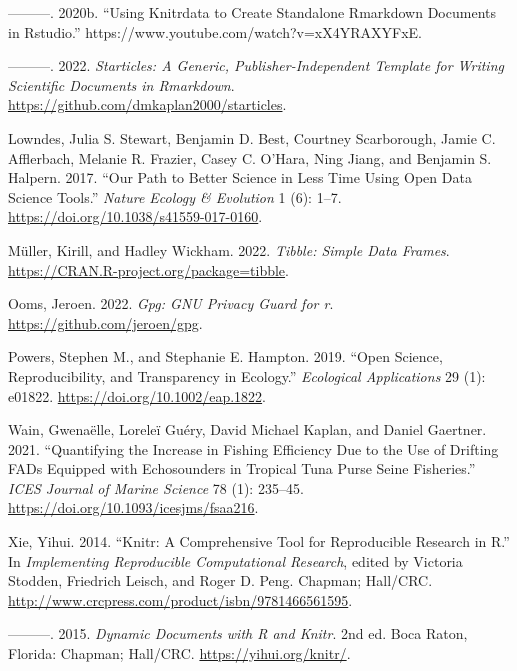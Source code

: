 \begin{CSLReferences}{1}{0}
\leavevmode{}%
---------. 2020b. {``Using Knitrdata to Create Standalone {Rmarkdown} Documents in {Rstudio}.''} https://www.youtube.com/watch?v=xX4YRAXYFxE.

\leavevmode{}%
---------. 2022. \emph{Starticles: A Generic, Publisher-Independent Template for Writing Scientific Documents in Rmarkdown}. \url{https://github.com/dmkaplan2000/starticles}.

\leavevmode{}%
Lowndes, Julia S. Stewart, Benjamin D. Best, Courtney Scarborough, Jamie C. Afflerbach, Melanie R. Frazier, Casey C. O'Hara, Ning Jiang, and Benjamin S. Halpern. 2017. {``Our Path to Better Science in Less Time Using Open Data Science Tools.''} \emph{Nature Ecology \& Evolution} 1 (6): 1--7. \url{https://doi.org/10.1038/s41559-017-0160}.

\leavevmode{}%
Müller, Kirill, and Hadley Wickham. 2022. \emph{Tibble: Simple Data Frames}. \url{https://CRAN.R-project.org/package=tibble}.

\leavevmode{}%
Ooms, Jeroen. 2022. \emph{Gpg: GNU Privacy Guard for r}. \url{https://github.com/jeroen/gpg}.

\leavevmode{}%
Powers, Stephen M., and Stephanie E. Hampton. 2019. {``Open Science, Reproducibility, and Transparency in Ecology.''} \emph{Ecological Applications} 29 (1): e01822. \url{https://doi.org/10.1002/eap.1822}.

\leavevmode{}%
Wain, Gwenaëlle, Loreleï Guéry, David Michael Kaplan, and Daniel Gaertner. 2021. {``Quantifying the Increase in Fishing Efficiency Due to the Use of Drifting {FADs} Equipped with Echosounders in Tropical Tuna Purse Seine Fisheries.''} \emph{ICES Journal of Marine Science} 78 (1): 235--45. \url{https://doi.org/10.1093/icesjms/fsaa216}.

\leavevmode{}%
Xie, Yihui. 2014. {``Knitr: A Comprehensive Tool for Reproducible Research in {R}.''} In \emph{Implementing Reproducible Computational Research}, edited by Victoria Stodden, Friedrich Leisch, and Roger D. Peng. Chapman; Hall/CRC. \url{http://www.crcpress.com/product/isbn/9781466561595}.

\leavevmode{}%
---------. 2015. \emph{Dynamic Documents with {R} and Knitr}. 2nd ed. Boca Raton, Florida: Chapman; Hall/CRC. \url{https://yihui.org/knitr/}.


\end{CSLReferences}
